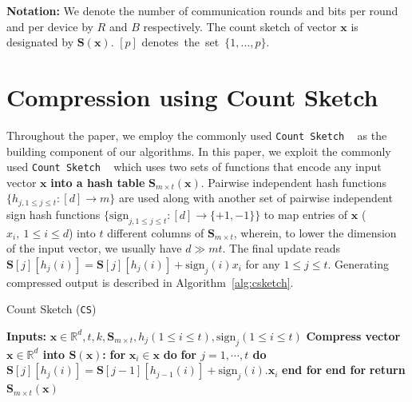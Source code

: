 \documentclass[sigconf, anonymous, review]{acmart}
\begin{document}
\noindent\textbf{Notation:} 
We denote the number of communication rounds and bits per round and per device by $R$ and $B$ respectively. 
The count sketch of vector $\boldsymbol{x}$ is designated by $\mathbf{S}(\boldsymbol{x})$. $[p]$ denotes~the~set~$\{1,\dots,p\}$.




\section{Compression using Count Sketch}\label{sec:compression}


Throughout the paper, we employ the commonly used \texttt{Count Sketch} ~\citep{DBLP:journals/tcs/CharikarCF04} as the building component of our algorithms. 
 In this paper, we exploit the commonly used \texttt{Count Sketch} ~\citep{DBLP:journals/tcs/CharikarCF04} 
 which uses two sets of functions that encode any input vector $\boldsymbol{x}$ \textbf{into a hash table} $\boldsymbol{S}_{m\times t}(\boldsymbol{x})$. 
Pairwise independent hash functions $\{h_{j,1\leq j\leq t }:[d]\rightarrow m\}$ are used along with another set of pairwise independent sign hash functions $\{\text{sign}_{j,1\leq j\leq t}: [d]\rightarrow \{+1,-1\}\}$ to map entries of $\boldsymbol{x}$ (${x}_i, \:1\leq i\leq d$) into $t$ different columns of $\mathbf{S}_{m\times t}$, wherein, to lower the dimension of the input vector, we usually have $d\gg mt$.  
The final update reads $\mathbf{S}[j][h_j(i)]=\mathbf{S}[j][h_{j}(i)]+\text{sign}_j(i){x}_i$ for any $1 \leq j \leq t$. 
Generating compressed output is described in Algorithm~\ref{alg:csketch}.

 \begin{algorithm}[H]
\caption{Count Sketch ({\texttt{CS})~\citep{DBLP:journals/tcs/CharikarCF04}} }\label{alg:csketch}
 \begin{algorithmic}[1]
\STATE \textbf{Inputs:} $\boldsymbol{x}\in\mathbb{R}^{d}, t, k, \mathbf{S}_{m\times t}, h_j (1\leq i\leq t), \text{sign}_j (1\leq i\leq t)$
 \STATE \textbf{Compress vector $\boldsymbol{x}\in\mathbb{R}^{d}$ into $\mathbf{S}\left(\boldsymbol{x}\right)$:}
 \STATE \textbf{for} $\boldsymbol{x}_i\in\boldsymbol{x}$ \textbf{do}
 \STATE \quad\textbf{for $j=1,\cdots,t$ do}
 \STATE \quad\quad $\mathbf{S}[j][h_j(i)]=\mathbf{S}[j-1][h_{j-1}(i)]+\text{sign}_j(i).\boldsymbol{x}_i$ 
 \STATE \quad\textbf{end for}
 \STATE \textbf{end for}
 \STATE \textbf{return} $\mathbf{S}_{m\times t}(\boldsymbol{x})$
 \end{algorithmic}
 \end{algorithm}
\end{document}
